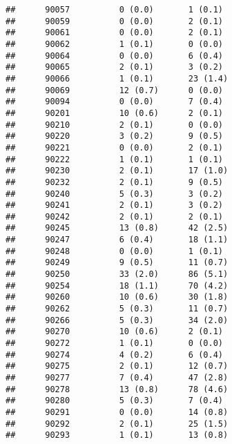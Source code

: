 \documentclass[]{article}
\begin{document}
\begin{verbatim}
##      90057          0 (0.0)       1 (0.1)                        
##      90059          0 (0.0)       2 (0.1)                        
##      90061          0 (0.0)       2 (0.1)                        
##      90062          1 (0.1)       0 (0.0)                        
##      90064          0 (0.0)       6 (0.4)                        
##      90065          2 (0.1)       3 (0.2)                        
##      90066          1 (0.1)       23 (1.4)                       
##      90069          12 (0.7)      0 (0.0)                        
##      90094          0 (0.0)       7 (0.4)                        
##      90201          10 (0.6)      2 (0.1)                        
##      90210          2 (0.1)       0 (0.0)                        
##      90220          3 (0.2)       9 (0.5)                        
##      90221          0 (0.0)       2 (0.1)                        
##      90222          1 (0.1)       1 (0.1)                        
##      90230          2 (0.1)       17 (1.0)                       
##      90232          2 (0.1)       9 (0.5)                        
##      90240          5 (0.3)       3 (0.2)                        
##      90241          2 (0.1)       3 (0.2)                        
##      90242          2 (0.1)       2 (0.1)                        
##      90245          13 (0.8)      42 (2.5)                       
##      90247          6 (0.4)       18 (1.1)                       
##      90248          0 (0.0)       1 (0.1)                        
##      90249          9 (0.5)       11 (0.7)                       
##      90250          33 (2.0)      86 (5.1)                       
##      90254          18 (1.1)      70 (4.2)                       
##      90260          10 (0.6)      30 (1.8)                       
##      90262          5 (0.3)       11 (0.7)                       
##      90266          5 (0.3)       34 (2.0)                       
##      90270          10 (0.6)      2 (0.1)                        
##      90272          1 (0.1)       0 (0.0)                        
##      90274          4 (0.2)       6 (0.4)                        
##      90275          2 (0.1)       12 (0.7)                       
##      90277          7 (0.4)       47 (2.8)                       
##      90278          13 (0.8)      78 (4.6)                       
##      90280          5 (0.3)       7 (0.4)                        
##      90291          0 (0.0)       14 (0.8)                       
##      90292          2 (0.1)       25 (1.5)                       
##      90293          1 (0.1)       13 (0.8)                       

\end{verbatim}
\end{document}
